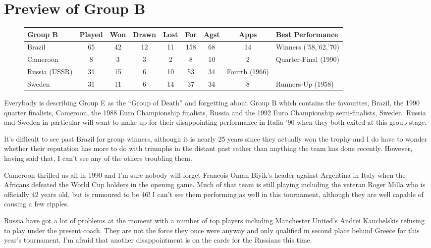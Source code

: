 \chapter{Preview of Group B}
\newline
\newline
\begin{figure}[H]
\small
\begin{tabular}{l c c c c c c c l}
Group B & Played & Won & Drawn & Lost & For & Agst & Apps & Best Performance\\ \hline
Brazil & 65 & 42 & 12 & 11 & 158 & 68 & 14 & Winners ('58,'62,'70) \\
Cameroon & 8 & 3 & 3 & 2 & 8 & 10 & 2 & Quarter-Final (1990) \\
Russia (USSR) & 31 & 15 & 6 & 10 & 53 & 34 & Fourth (1966) \\
Sweden & 31 & 11 & 6 & 14 & 37 & 34 & 8 & Runners-Up (1958) \\ \hline
\end{tabular}
\normalsize
\end{figure}
Everybody is describing Group E as the ``Group of Death'' and forgetting about
Group B which contains the favourites, Brazil, the 1990 quarter finalists, 
Cameroon, the 1988 Euro Championship finalists, Russia and the 1992 Euro
Championship semi-finalists, Sweden. Russia and Sweden in particular will want 
to make up for their disappointing performance in Italia '90 when they both 
exited at this group stage.

It's difficult to see past Brazil for group winners, although it is nearly 25
years since they actually won the trophy and I do have to wonder whether their
reputation has more to do with triumphs in the distant past rather than 
anything the team has done recently. However, having said that, I can't see 
any of the others troubling them.

Cameroon thrilled us all in 1990 and I'm sure nobody will forget Francois 
Oman-Biyik's header against Argentina in Italy when the Africans defeated the
World Cup holders in the opening game. Much of that team is still playing 
including the veteran Roger Milla who is officially 42 years old, but is 
rumoured to be 46! I can't see them performing as well in this tournament,
although they are well capable of causing a few ripples.

Russia have got a lot of problems at the moment with a number of top players
including Manchester United's Andrei Kanchelskis refusing to play under the 
present coach. They are not the force they once were anyway and only qualified 
in second place behind Greece for this year's tournament. I'm afraid that 
another disappointment is on the cards for the Russians this time.

